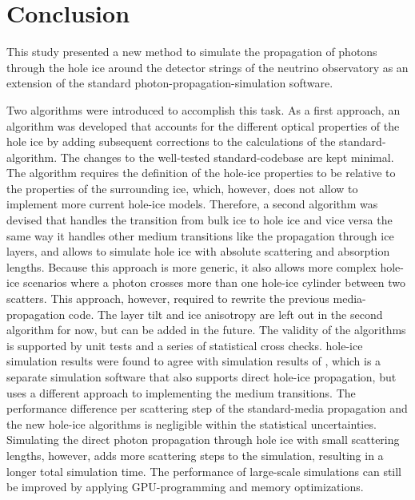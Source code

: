 
\section{Conclusion}
\label{sec:conclusion}

This study presented a new method to simulate the propagation of photons through the hole ice around the detector strings of the \icecube neutrino observatory as an extension of the standard \clsim photon-propagation-simulation software.

Two algorithms were introduced to accomplish this task.
As a first approach, an algorithm was developed that accounts for the different optical properties of the hole ice by adding subsequent corrections to the calculations of the standard-\clsim algorithm.
The changes to the well-tested standard-\clsim codebase are kept minimal.
The algorithm requires the definition of the hole-ice properties to be relative to the properties of the surrounding ice, which, however, does not allow to implement more current hole-ice models.
Therefore, a second algorithm was devised that handles the transition from bulk ice to hole ice and vice versa the same way it handles other medium transitions like the propagation through ice layers, and allows to simulate hole ice with absolute scattering and absorption lengths.
Because this approach is more generic, it also allows more complex hole-ice scenarios where a photon crosses more than one hole-ice cylinder between two scatters.
This approach, however, required to rewrite the previous \clsim media-propagation code.
The layer tilt and ice anisotropy are left out in the second algorithm for now, but can be added in the future.
The validity of the algorithms is supported by unit tests and a series of statistical cross checks.
\clsim hole-ice simulation results were found to agree with simulation results of \ppc, which is a separate \icecube simulation software that also supports direct hole-ice propagation, but uses a different approach to implementing the medium transitions.
The performance difference per scattering step of the standard-\clsim media propagation and the new hole-ice algorithms is negligible within the statistical uncertainties.
Simulating the direct photon propagation through hole ice with small scattering lengths, however, adds more scattering steps to the simulation, resulting in a longer total simulation time.
The performance of large-scale simulations can still be improved by applying GPU-programming and memory optimizations.

